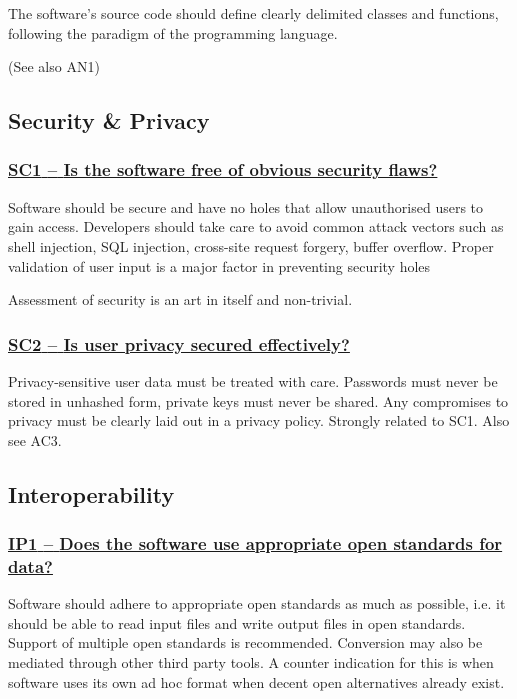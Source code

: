 \documentclass[a4paper,11pt]{article}
\newcommand{\criterion}[1]{\subsubsection*{\underline{#1}}}
\begin{document}
The software's source code should define clearly delimited classes and
functions, following the paradigm of the programming language. 

(See also AN1)

\subsection{Security \& Privacy}\label{sec:sec}

\newcommand{\scOneID}{SC1}
\newcommand{\scOneText}{Is the software free of obvious security flaws?}
\criterion{\scOneID{ }--{ }\scOneText}\label{id:sc1} 

Software should be secure and have no holes that allow unauthorised users to
gain access. Developers should take care to avoid common attack vectors such as
shell injection, SQL injection, cross-site request forgery, buffer overflow.
Proper validation of user input is a major factor in preventing security holes

Assessment of security is an art in itself and non-trivial. 

\newcommand{\scTwoID}{SC2}
\newcommand{\scTwoText}{Is user privacy secured effectively?}
\criterion{\scTwoID{ }--{ }\scTwoText}\label{id:sc2} 

Privacy-sensitive user data must be treated with care. Passwords must never be
stored in unhashed form, private keys must never be shared. Any compromises to
privacy must be clearly laid out in a privacy policy.  Strongly related to SC1.
Also see AC3.

\subsection{Interoperability}\label{sec:int}

\newcommand{\ipOneID}{IP1}
\newcommand{\ipOneText}{Does the software use appropriate open standards for data?}
\criterion{\ipOneID{ }--{ }\ipOneText}\label{id:ip1} 

Software should adhere to appropriate open standards as much as possible, i.e.
it should be able to read input files and write output files in open
standards. Support of multiple open standards is recommended. Conversion may
also be mediated through other third party tools. A counter indication for this
is when software uses its own ad hoc format when decent open alternatives
already exist.
\end{document}
